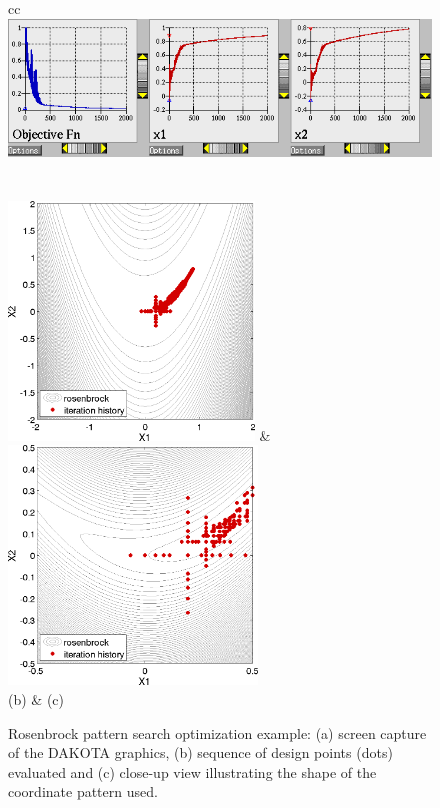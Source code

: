 \begin{figure}[ht!]
  \centering
  \begin{tabular}{cc}
	      {\includegraphics[width=\textwidth]{images/dak_graphics_ps_opt}}\\
  \\
  \qquad\\
  \includegraphics[height=2.5in]{images/rosen_ps_opt_pts} &
  \includegraphics[height=2.5in]{images/rosen_ps_opt_pts2} \\
  (b) & (c)
  \end{tabular}
  \caption{Rosenbrock pattern search optimization example: (a) screen
    capture of the DAKOTA graphics, (b) sequence of design points
    (dots) evaluated and (c) close-up view illustrating the shape of
    the coordinate pattern used. }
  \label{tutorial:rosenbrock_patternsearch_graphics}
\end{figure}


